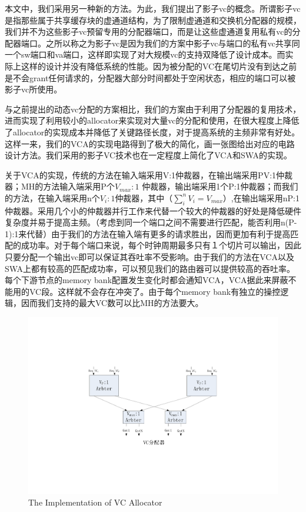 ﻿\documentclass[10pt,journal]{IEEEtran}
\begin{document}
本文中，我们采用另一种新的方法。为此，我们提出了影子vc的概念。所谓影子vc是指那些属于共享缓存块的虚通道结构，为了限制虚通道和交换机分配器的规模，我们并不为这些影子vc预留专用的分配器端口，而是让这些虚通道复用私有vc的分配器端口。之所以称之为影子vc是因为我们的方案中影子vc与端口的私有vc共享同一个sw端口和va端口，这样即实现了对大规模vc的支持双降低了设计成本。而实际上这样的设计并没有降低系统的性能。因为被分配的VC在尾切片没有到达之前是不会grant任何请求的，分配器大部分时间都处于空闲状态，相应的端口可以被影子vc所使用。

与之前提出的动态vc分配的方案相比，我们的方案由于利用了分配器的复用技术，进而实现了利用较小的allocator来实现对大量vc的分配和使用，在很大程度上降低了allocator的实现成本并降低了关键路径长度，对于提高系统的主频非常有好处。这样一来，我们的VCA的实现电路得到了极大的简化，画一张图给出对应的电路设计方法。我们采用的影子VC技术也在一定程度上简化了VCA和SWA的实现。

关于VCA的实现，传统的方法在输入端采用V:1仲裁器，在输出端采用PV:1仲裁器；MH的方法输入端采用P个$V_{max}:1$ 仲裁器，输出端采用1个P:1仲裁器；而我们的方法，在输入端采用n个$V_i:1$仲裁器，其中（$\sum_{i}^nV_i=V_{max}$）,在输出端采用nP:1 仲裁器。采用几个小的仲裁器并行工作来代替一个较大的仲裁器的好处是降低硬件复杂度并易于提高主频。（考虑到同一个端口之间不需要进行匹配，能否利用n(P-1):1来代替）由于我们的方法在输入端有更多的请求胜出，因而更加有利于提高匹配的成功率。对于每个端口来说，每个时钟周期最多只有１个切片可以输出，因此只要分配一个输出vc即可以保证其吞吐率不受影响。由于我们的方法在VCA以及SWA上都有较高的匹配成功率，可以预见我们的路由器可以提供较高的吞吐率。每个下游节点的memory bank配置发生变化时都会通知VCA，VCA据此来屏蔽不能用的VC段。这样就不会存在冲突了。由于每个memory bank有独立的操控逻辑，因而我们支持的最大VC数可以比MH的方法要大。
\begin{figure}
\centering\includegraphics[scale=0.5]{figures/vcallocator.pdf}
\caption{The Implementation of VC Allocator}\label{vcallocator}
\end{figure}
\end{document}
